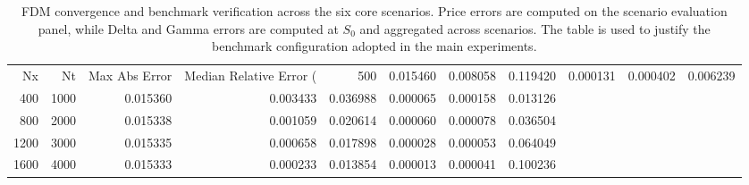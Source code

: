 \begin{table}
\caption{FDM convergence and benchmark verification across the six core scenarios. Price errors are computed on the scenario evaluation panel, while Delta and Gamma errors are computed at $S_0$ and aggregated across scenarios. The table is used to justify the benchmark configuration adopted in the main experiments.}
\label{tab:fdm_convergence}
\begin{tabular}{rrrrrrrr}
\toprule
Nx & Nt & Max Abs Error & Median Relative Error (%
 & 500 & 0.015460 & 0.008058 & 0.119420 & 0.000131 & 0.000402 & 0.006239 \\
400 & 1000 & 0.015360 & 0.003433 & 0.036988 & 0.000065 & 0.000158 & 0.013126 \\
800 & 2000 & 0.015338 & 0.001059 & 0.020614 & 0.000060 & 0.000078 & 0.036504 \\
1200 & 3000 & 0.015335 & 0.000658 & 0.017898 & 0.000028 & 0.000053 & 0.064049 \\
1600 & 4000 & 0.015333 & 0.000233 & 0.013854 & 0.000013 & 0.000041 & 0.100236 \\
\bottomrule
\end{tabular}
\end{table}

